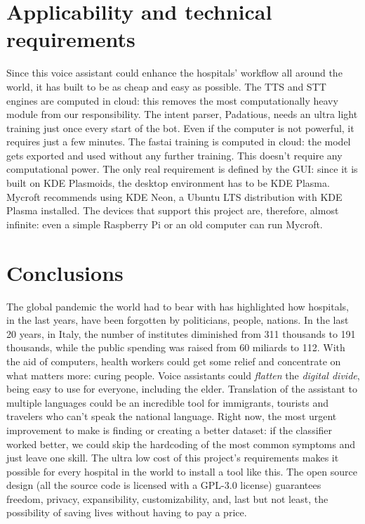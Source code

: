 \documentclass[conference]{IEEEtran}
\begin{document}
\section{Applicability and technical requirements}
\label{sec:applicability}
Since this voice assistant could enhance the hospitals' workflow all around the world, it has built to be as cheap and easy as possible. The TTS and STT engines are computed in cloud: this removes the most computationally heavy module from our responsibility. The intent parser, Padatious, needs an ultra light training just once every start of the bot. Even if the computer is not powerful, it requires just a few minutes. The fastai training is computed in cloud: the model gets exported and used without any further training. This doesn't require any computational power. The only real requirement is defined by the GUI: since it is built on KDE Plasmoids, the desktop environment has to be KDE Plasma. Mycroft recommends using KDE Neon, a Ubuntu LTS distribution with KDE Plasma installed. The devices that support this project are, therefore, almost infinite: even a simple Raspberry Pi or an old computer can run Mycroft.
\section{Conclusions}
\label{sec:conclusions}
The global pandemic the world had to bear with has highlighted how hospitals, in the last years, have been forgotten by politicians, people, nations. In the last 20 years, in Italy, the number of institutes diminished from 311 thousands to 191 thousands, while the public spending was raised from 60 miliards to 112\cite{ospedali-agi}. With the aid of computers, health workers could get some relief and concentrate on what matters more: curing people. Voice assistants could \textit{flatten} the
\textit{digital divide}, being easy to use for everyone, including the elder. Translation of the assistant to multiple languages could be an incredible tool for immigrants, tourists and travelers who can't speak the national language. Right now, the most urgent improvement to make is finding or creating a better dataset: if the classifier worked better, we could skip the hardcoding of the most common symptoms and just leave one skill. The ultra low cost of this project's requirements makes it possible for every hospital in the world to install a tool like this. The open source design (all the source code is licensed with a GPL-3.0 license) guarantees freedom, privacy, expansibility, customizability, and, last but not least, the possibility of saving lives without having to pay a price.
\end{document}
